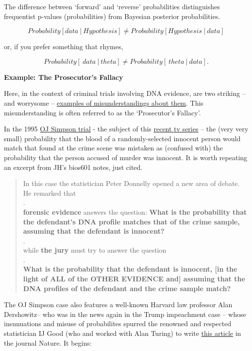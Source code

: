 \documentclass[]{book}
\begin{document}
The difference between `forward' and `reverse' probabilities
distinguishes frequentist p-values (probabilities) from Bayesian
posterior probabilities.

\[Probability[ data \ | \ Hypothesis ] \neq Probability[ Hypothesis \ | \ data ]\]

or, if you prefer something that rhymes,

\[Probability[ \ data \ | \  theta ] \neq Probability[ \ theta \ | \ data ].\]

\textbf{Example: The Prosecutor's Fallacy}

Here, in the context of criminal trials involving DNA evidence, are two striking -- and worrysome -- \href{http://www.medicine.mcgill.ca/epidemiology/hanley/bios601/ch-01-02-PlusNotesSept2019.pdf\#page=19}{examples of misunderstandings about them}. This misunderstanding is often referred to as the `Prosecutor's Fallacy'.

In the 1995 \href{https://www.britannica.com/event/O-J-Simpson-trial}{OJ Simpson trial}
- the subject of this \href{https://en.wikipedia.org/wiki/The_People_v._O._J._Simpson:_American_Crime_Story}{recent tv series} --
the (very very small) probability that the blood of a randomly-selected innocent person would match that found at the crime scene was mistaken as (confused with) the probability that the person accused of murder was innocent. It is worth repeating an excerpt from JH's bios601 notes, just cited.

\begin{quote}
In this case the statistician Peter Donnelly opened a new area of debate. He remarked that\\
.\\
\textbf{forensic evidence} answers the question: \textbf{What is the probability that the defendant's DNA profile matches that of the crime sample, assuming that the defendant is innocent?}\\
.\\
while \textbf{the jury} must try to answer the question\\
.\\
\textbf{What is the probability that the defendant is innocent, {[}in the light of ALL of the OTHER EVIDENCE and{]} assuming that the DNA profiles of the defendant and the crime sample match?}
\end{quote}

The OJ Simpson case also features a well-known Harvard law professor Alan Dershowitz-- who was in the news again in the Trump impeachment case -- whose insunuations and misuse of probabilites spurred the renowned and respected statistician IJ Good (who and worked with Alan Turing) to write \href{http://www.biostat.mcgill.ca/hanley/statbook/WhenBattererTurnsMurdererIJGOOD.pdf}{this article} in the journal Nature. It begins:
\end{document}
